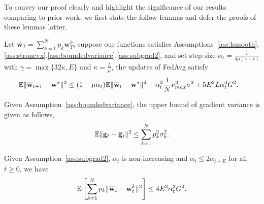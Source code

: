 
To convey our proof clearly and highlight the significance of our results comparing to prior work, 
we first state the follow lemmas and defer the proofs of these lemmas latter. 
\begin{lemma} Let $\overline{\mathbf{w}}_{T}=\sum_{k=1}^{N}p_{k}\mathbf{w}_{T}^{k}$,
suppose our functions satisfies Assumptions~\ref{ass:lsmooth},\ref{ass:stroncvx},\ref{ass:boundedvariance},\ref{ass:subgrad2}, and set step size $\alpha_{t}=\frac{1}{4\mu(\gamma+t)}$
	with $\gamma=\max\{32\kappa,E\}$ and $\kappa=\frac{L}{\mu}$, the updates of FedAvg satisfy
	\begin{align*}
	\mathbb{E}\|{\overline{\mathbf{w}}}_{t+1}-{\mathbf{w}}^{\ast}\|^{2} & \leq(1-\mu\alpha_{t})\mathbb{E}\|{\overline{\mathbf{w}}}_{t}-{\mathbf{w}}^{\ast}\|^{2}+\alpha_{t}^{2}\frac{1}{N}\nu_{max}^{2}\sigma^{2}+5E^{2}L\alpha_{t}^{3}G^{2}.
	\end{align*}
\label{lem:scvxoner}
\end{lemma}

\begin{lemma}
Given Assumption~\ref{ass:boundedvariance}, the upper bound of gradient variance is given as follows,
\begin{align*}
	\mathbb{E}\|{\mathbf{g}}_{t}-{\overline{\mathbf{g}}}_{t}\|^{2} \leq \sum_{k=1}^{N}p_{k}^{2}\sigma_{k}^{2}.
	\end{align*}
\label{lem:bgv}
\end{lemma}

\begin{lemma}
Given Assumption~\ref{ass:subgrad2}, $\alpha_t$ is non-increasing and $\alpha_t \leq 2\alpha_{t+E}$ for all $t\geq 0$, we have
	\begin{align*}
	\mathbb{E}\left[\sum_{k=1}^{N}p_{k}\|{\overline{\mathbf{w}}}_{t}-{\mathbf{w}}_{t}^{k}\|^{2} \right]\leq 4E^{2}\alpha_{t}^{2}G^{2}.
	\end{align*}
\label{lem:bdw}
\end{lemma}


